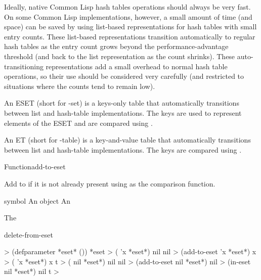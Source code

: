 \documentclass[10pt,twoside,english,pdftex]{article}
\begin{document}
%
%
%
%
%
Ideally, native Common Lisp hash tables operations should always be very fast.
On some Common Lisp implementations, however, a small amount of time (and
space) can be saved by using list-based representations for hash tables with
small entry counts.  These list-based representations transition automatically
to regular hash tables as the entry count grows beyond the
performance-advantage threshold (and back to the list representation as the
count shrinks).  These auto-transitioning representations add a small overhead
to normal hash table operations, so their use should be considered very
carefully (and restricted to situations where the counts tend to remain low).

%
%
An ESET (short for -set) is a keys-only table that automatically
transitions between list and hash-table implementations.  The keys are used to
represent elements of the ESET and are compared using .

%
%
An ET (short for -table) is a key-and-value table that automatically
transitions between list and hash-table implementations.  The keys are
compared using .


\begin{functiondoc}{Function}{add-to-eset}{
    }
  
\fnsyntax

\fnpurpose Add  to  if it is not already present
using  as the comparison function.

\fnpackage {}

\fnmodule {}

\fnargs
\begin{args}{symbol}
\arg[item] An object
\arg[eset] An 
\end{args}

\fnreturns The 

\begin{alsos}{delete-from-eset}
\also[in-eset]
\end{alsos}

\fnexamples
{}%
%
%
\W\supp
\begin{example}
  > (defparameter *eset* ())
  *eset
  > ( 'x *eset*)
  nil
  nil
  > (add-to-eset 'x *eset*)
  x
  > ( 'x *eset*)
  x
  t\goodpagebreak
  > ( nil *eset*)
  nil
  nil
  > (add-to-eset nil *eset*)
  nil
  > (in-eset nil *eset*)
  nil
  t
  > 
\end{example}

\end{functiondoc}
\end{document}
